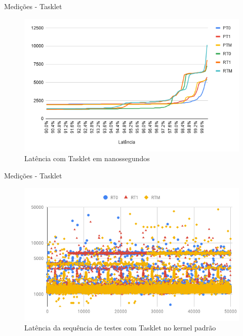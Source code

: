 \documentclass[12pt,brazil]{beamer}
\begin{document}
\begin{frame}{Medições - Tasklet}
    
    \begin{figure}[!htb]
        \centering
        \includegraphics[width=\textwidth]{figures/tasklet.png}
        \caption*{Latência com Tasklet em nanossegundos}
        \label{grafico:softirq}
    \end{figure}

\end{frame}

\begin{frame}{Medições - Tasklet}
    
    \begin{figure}[!htb]
        \centering
        \includegraphics[width=\textwidth]{figures/rt-scatter.png}
        \caption*{Latência da sequência de testes com Tasklet no kernel padrão}
        \label{grafico:r-softirq}
    \end{figure}

\end{frame}
\end{document}

